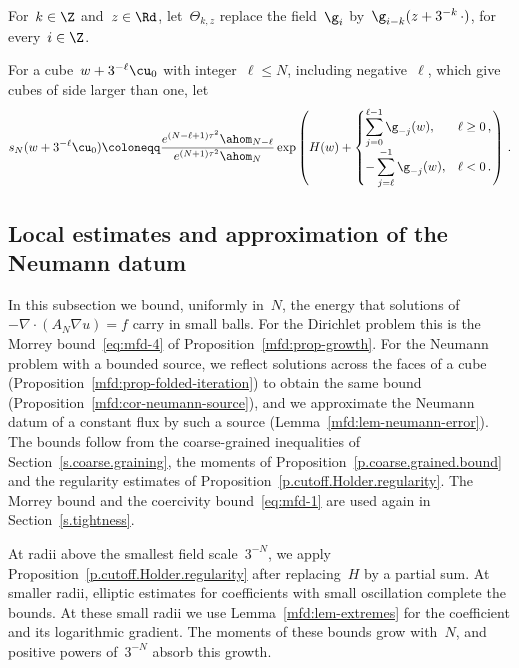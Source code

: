 \documentclass[11pt]{amsart}
\begin{document}
\smallskip

For~$k\in\Z$ and~$z\in\Rd$, let~$\Theta_{k,z}$ replace the field~$\g_i$ by~$\g_{i-k}(z+3^{-k}\,\cdot)$, for every~$i\in\Z$.

\smallskip

For a cube~$w+3^{-\ell}\cu_0$ with integer~$\ell\leq N$, including negative~$\ell$, which give cubes of side larger than one, let
\begin{equation*}
	s_N(w+3^{-\ell}\cu_0)\coloneqq
	\frac{e^{(N-\ell+1)\tau^2}\ahom_{N-\ell}}{e^{(N+1)\tau^2}\ahom_N}
	\exp\left(H(w)+
	\begin{cases}
		\displaystyle\sum_{j=0}^{\ell-1}\g_{-j}(w),&\ell\geq0\,,\\
		\displaystyle-\sum_{j=\ell}^{-1}\g_{-j}(w),&\ell<0\,.
	\end{cases}
	\right)\,.
\end{equation*}

\subsection{Local estimates and approximation of the Neumann datum}
\label{mfd:sec-local}

In this subsection we bound, uniformly in~$N$, the energy that solutions of~$-\nabla\cdot(A_N\nabla u)=f$ carry in small balls. For the Dirichlet problem this is the Morrey bound~\eqref{eq:mfd-4} of Proposition~\ref{mfd:prop-growth}. For the Neumann problem with a bounded source, we reflect solutions across the faces of a cube (Proposition~\ref{mfd:prop-folded-iteration}) to obtain the same bound (Proposition~\ref{mfd:cor-neumann-source}), and we approximate the Neumann datum of a constant flux by such a source (Lemma~\ref{mfd:lem-neumann-error}). The bounds follow from the coarse-grained inequalities of Section~\ref{s.coarse.graining}, the moments of Proposition~\ref{p.coarse.grained.bound} and the regularity estimates of Proposition~\ref{p.cutoff.Holder.regularity}. The Morrey bound and the coercivity bound~\eqref{eq:mfd-1} are used again in Section~\ref{s.tightness}.

\smallskip

At radii above the smallest field scale~$3^{-N}$, we apply Proposition~\ref{p.cutoff.Holder.regularity} after replacing~$H$ by a partial sum. At smaller radii, elliptic estimates for coefficients with small oscillation complete the bounds. At these small radii we use Lemma~\ref{mfd:lem-extremes} for the coefficient and its logarithmic gradient. The moments of these bounds grow with~$N$, and positive powers of~$3^{-N}$ absorb this growth.
\end{document}
